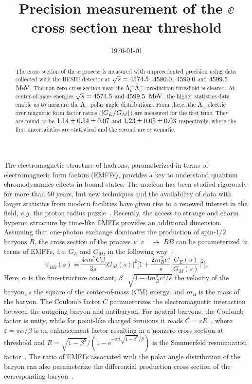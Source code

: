 \documentclass[twocolumn,showpacs,superscriptaddress,amsmath,amssymb]{revtex4-1}
\begin{document}
\title{\boldmath Precision measurement of the $\ee$ cross section near threshold}
  

\date{\today}

\begin{abstract}
The cross section of the $\ee$ process is measured with unprecedented precision using data collected with the BESIII detector at $\sqrt{s}=4574.5$, $4580.0$, $4590.0$ and $4599.5$~$\mathrm{MeV}$. The non-zero cross section near the $\Lambda_{c}^{+}\bar{\Lambda}_{c}^{-}$ production threshold is cleared. 
At center-of-mass energies $\sqrt{s}=4574.5$ and $4599.5$~$\mathrm{MeV}$, the higher statistics data enable us to measure the $\Lambda_{c}$ polar angle distributions. From these, the $\Lambda_{c}$ electric over magnetic form factor ratios ($|G_{E}/G_{M}|$) are measured for the first time. They are found to be $1.14\pm0.14\pm0.07$ and $1.23\pm0.05\pm0.03$ respectively, where the first uncertainties are statistical and the second are systematic. 
\end{abstract}

\maketitle

The electromagnetic structure of hadrons, parameterized in terms of electromagnetic form factors (EMFFs), provides a key to understand quantum chromodynamics effects in bound states. The nucleon has been studied rigorously for more than 60 years, but new techniques and the availability of data with larger statistics from modern facilities have given rise to a renewed interest in the field, \textit{e.g.} the proton radius puzzle~\cite{pradius}. Recently, the access to strange and charm hyperon structure by time-like EMFFs provides an additional dimension. Assuming that one-photon exchange dominates the production of spin-1/2 baryons $B$, the cross section of the process $e^{+}e^{-}$~$\rightarrow$~$B\bar{B}$ can be parameterized in terms of EMFFs,  \textit{i.e.} $G_{E}$ and $G_{M}$, in the following way~\cite{OPEXModel}:
\begin{equation}
\sigma_{B\bar{B}}(s)=\frac{4\pi\alpha^{2} C \beta}{3s}|G_{M}(s)|^{2}\big[1+\frac{2m_{B}^{2}c^{4}}{s}\big|\frac{G_{E}(s)}{G_{M}(s)}\big|^{2}\big].
\label{OnePhotonPre}
\end{equation}
Here, $\alpha$ is the fine-structure constant, $\beta$=$\sqrt{1-4m_{B}^{2}c^{4}/s}$ the velocity of the baryon, $s$ the square of the center-of-mass (CM) energy, and $m_{B}$ is the mass of the baryon. The Coulomb factor $C$ parameterizes the electromagnetic interaction between the outgoing baryon and antibaryon. 
For neutral baryons, the Coulomb factor is unity, while for point-like charged fermions it reads $C=\varepsilon R$~\cite{C1,C2}, where $\varepsilon = {\pi\alpha}/{\beta}$ is an enhancement factor resulting in a nonzero cross section at threshold and $R={\sqrt{1-\beta^{2}}}/(1-e^{-\pi\alpha{\sqrt{1-\beta^{2}}}/\beta})$ is the Sommerfeld resummation factor~\cite{C1}. The ratio of EMFFs associated with the polar angle distribution of the baryon can also parameterize the differential production cross section of the corresponding baryon~\cite{OPEXModel}.
\end{document}
